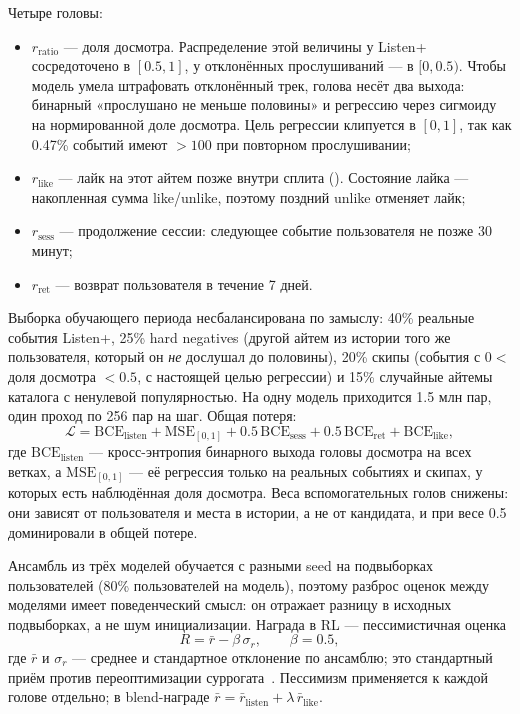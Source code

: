 Четыре головы:
\begin{itemize}[leftmargin=1.2em,itemsep=1pt,topsep=2pt]
  \item $r_{\text{ratio}}$ --- доля досмотра. Распределение этой величины
  у Listen+ сосредоточено в $[0.5,1]$, у отклонённых прослушиваний ---
  в $[0,0.5)$. Чтобы модель умела штрафовать отклонённый трек, голова
  несёт два выхода: бинарный «прослушано не меньше половины» и
  регрессию через сигмоиду на нормированной доле досмотра. Цель регрессии
  клипуется в $[0,1]$, так как 0.47\% событий имеют
   $>100$ при повторном прослушивании;
  \item $r_{\text{like}}$ --- лайк на этот айтем позже внутри сплита
  (). Состояние лайка --- накопленная сумма like/unlike,
  поэтому поздний unlike отменяет лайк;
  \item $r_{\text{sess}}$ --- продолжение сессии: следующее событие
  пользователя не позже 30 минут;
  \item $r_{\text{ret}}$ --- возврат пользователя в течение 7 дней.
\end{itemize}

Выборка обучающего периода несбалансирована по замыслу: 40\% реальные
события Listen+, 25\% hard negatives (другой айтем из истории того же
пользователя, который он \emph{не} дослушал до половины), 20\% скипы
(события с $0 <$ доля досмотра $< 0.5$, с настоящей целью регрессии) и
15\% случайные айтемы каталога с ненулевой популярностью. На одну модель
приходится 1.5 млн пар, один проход по 256 пар на шаг. Общая потеря:
\begin{equation}
\mathcal{L} =
\mathrm{BCE}_{\text{listen}}
+\mathrm{MSE}_{[0,1]}
+0.5\,\mathrm{BCE}_{\text{sess}}
+0.5\,\mathrm{BCE}_{\text{ret}}
+\mathrm{BCE}_{\text{like}},
\end{equation}
где $\mathrm{BCE}_{\text{listen}}$ --- кросс-энтропия бинарного выхода
головы досмотра на всех ветках, а $\mathrm{MSE}_{[0,1]}$ --- её регрессия
только на реальных событиях и скипах, у которых есть наблюдённая доля
досмотра. Веса вспомогательных голов снижены: они
зависят от пользователя и места в истории, а не от кандидата, и при весе 0.5
доминировали в общей потере.

Ансамбль из трёх моделей обучается с разными seed на подвыборках
пользователей (80\% пользователей на модель), поэтому разброс оценок между
моделями имеет поведенческий смысл: он отражает разницу в исходных
подвыборках, а не шум инициализации. Награда в RL --- пессимистичная оценка
\begin{equation}
R = \bar r - \beta\,\sigma_r,\qquad \beta = 0.5,
\end{equation}
где $\bar r$ и $\sigma_r$ --- среднее и стандартное отклонение по ансамблю;
это стандартный приём против переоптимизации суррогата~\cite{gao2022}.
Пессимизм применяется к каждой голове отдельно; в blend-награде
$\bar r = \bar r_{\text{listen}} + \lambda\,\bar r_{\text{like}}$.

